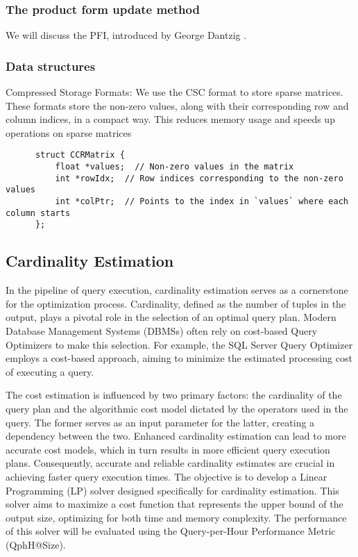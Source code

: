 \subsubsection*{The product form update method}
We will discuss the PFI, introduced by George Dantzig \parencite{dantzig1954product}.
\subsubsection*{Data structures}
Compressed Storage Formats:
We use the CSC format to store sparse matrices. These formats store the non-zero values, along with their corresponding row and column indices,
in a compact way. This reduces memory usage and speeds up operations on sparse matrices

\begin{verbatim}
      struct CCRMatrix {
          float *values;  // Non-zero values in the matrix
          int *rowIdx;  // Row indices corresponding to the non-zero values
          int *colPtr;  // Points to the index in `values` where each column starts
      };
  \end{verbatim}
\subsection{Cardinality Estimation}\label{subsection:cardinality-estimate}
In the pipeline of query execution, cardinality estimation serves
as a cornerstone for the optimization process.
Cardinality, defined as the number of tuples in the output,
plays a pivotal role in the selection of an optimal query plan.
Modern Database Management Systems (DBMSs) often rely on
cost-based Query Optimizers to make this selection.
For example, the SQL Server Query Optimizer
\parencite{microsoft2023cardinality} employs a
cost-based approach, aiming to minimize the estimated
processing cost of executing a query.

The cost estimation is influenced by two primary factors:
the cardinality of the query plan and the algorithmic cost
model dictated by the operators used in the query. The
former serves as an input parameter for the latter, creating
a dependency between the two. Enhanced cardinality estimation
can lead to more accurate cost models, which in turn results
in more efficient query execution plans.
Consequently, accurate and reliable cardinality estimates are crucial
in achieving faster query execution times.
The objective is to develop a Linear Programming (LP)
solver designed specifically for cardinality estimation.
This solver aims to maximize a cost function that represents
the upper bound of the output size, optimizing for both
time and memory complexity. The performance of this solver
will be evaluated using the Query-per-Hour Performance Metric
(QphH@Size).

